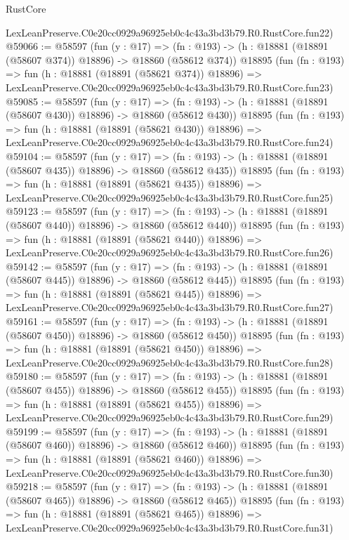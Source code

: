 \begin{lexlean}{RustCore}
\begin{coremodule}
    LexLeanPreserve.C0e20cc0929a96925eb0c4c43a3bd3b79.R0.RustCore.fun22)
@59066 := @58597
    (fun (y : @17) =>
    (fn : @193) -> (h : @18881 (@18891 (@58607 @374)) @18896) -> @18860 (@58612 @374))
    @18895
    (fun (fn : @193) =>
    fun (h : @18881 (@18891 (@58621 @374)) @18896) =>
    LexLeanPreserve.C0e20cc0929a96925eb0c4c43a3bd3b79.R0.RustCore.fun23)
@59085 := @58597
    (fun (y : @17) =>
    (fn : @193) -> (h : @18881 (@18891 (@58607 @430)) @18896) -> @18860 (@58612 @430))
    @18895
    (fun (fn : @193) =>
    fun (h : @18881 (@18891 (@58621 @430)) @18896) =>
    LexLeanPreserve.C0e20cc0929a96925eb0c4c43a3bd3b79.R0.RustCore.fun24)
@59104 := @58597
    (fun (y : @17) =>
    (fn : @193) -> (h : @18881 (@18891 (@58607 @435)) @18896) -> @18860 (@58612 @435))
    @18895
    (fun (fn : @193) =>
    fun (h : @18881 (@18891 (@58621 @435)) @18896) =>
    LexLeanPreserve.C0e20cc0929a96925eb0c4c43a3bd3b79.R0.RustCore.fun25)
@59123 := @58597
    (fun (y : @17) =>
    (fn : @193) -> (h : @18881 (@18891 (@58607 @440)) @18896) -> @18860 (@58612 @440))
    @18895
    (fun (fn : @193) =>
    fun (h : @18881 (@18891 (@58621 @440)) @18896) =>
    LexLeanPreserve.C0e20cc0929a96925eb0c4c43a3bd3b79.R0.RustCore.fun26)
@59142 := @58597
    (fun (y : @17) =>
    (fn : @193) -> (h : @18881 (@18891 (@58607 @445)) @18896) -> @18860 (@58612 @445))
    @18895
    (fun (fn : @193) =>
    fun (h : @18881 (@18891 (@58621 @445)) @18896) =>
    LexLeanPreserve.C0e20cc0929a96925eb0c4c43a3bd3b79.R0.RustCore.fun27)
@59161 := @58597
    (fun (y : @17) =>
    (fn : @193) -> (h : @18881 (@18891 (@58607 @450)) @18896) -> @18860 (@58612 @450))
    @18895
    (fun (fn : @193) =>
    fun (h : @18881 (@18891 (@58621 @450)) @18896) =>
    LexLeanPreserve.C0e20cc0929a96925eb0c4c43a3bd3b79.R0.RustCore.fun28)
@59180 := @58597
    (fun (y : @17) =>
    (fn : @193) -> (h : @18881 (@18891 (@58607 @455)) @18896) -> @18860 (@58612 @455))
    @18895
    (fun (fn : @193) =>
    fun (h : @18881 (@18891 (@58621 @455)) @18896) =>
    LexLeanPreserve.C0e20cc0929a96925eb0c4c43a3bd3b79.R0.RustCore.fun29)
@59199 := @58597
    (fun (y : @17) =>
    (fn : @193) -> (h : @18881 (@18891 (@58607 @460)) @18896) -> @18860 (@58612 @460))
    @18895
    (fun (fn : @193) =>
    fun (h : @18881 (@18891 (@58621 @460)) @18896) =>
    LexLeanPreserve.C0e20cc0929a96925eb0c4c43a3bd3b79.R0.RustCore.fun30)
@59218 := @58597
    (fun (y : @17) =>
    (fn : @193) -> (h : @18881 (@18891 (@58607 @465)) @18896) -> @18860 (@58612 @465))
    @18895
    (fun (fn : @193) =>
    fun (h : @18881 (@18891 (@58621 @465)) @18896) =>
    LexLeanPreserve.C0e20cc0929a96925eb0c4c43a3bd3b79.R0.RustCore.fun31)

\end{coremodule}
\end{lexlean}

